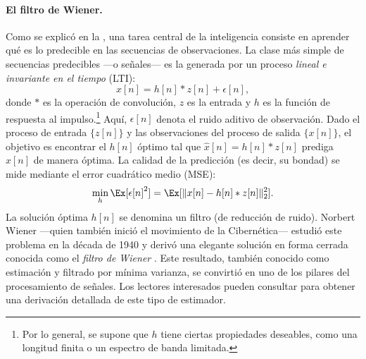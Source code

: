 \documentclass[../../book-main_es.tex]{subfiles}
\begin{document}
\paragraph{El filtro de Wiener.}
Como se explicó en la , una tarea central de
la inteligencia consiste en aprender qué es lo predecible en las secuencias de
observaciones. La clase más simple de secuencias predecibles ---o
señales--- es la generada por un proceso \textit{lineal e invariante en el tiempo} (LTI):
\begin{equation}
    x[n] = h[n]*z[n] + \epsilon[n],
    \label{eqn:Wiener-model}
\end{equation}
donde \(*\) es la operación de convolución, \(z\) es la entrada y
\(h\) es la función de respuesta al impulso.\footnote{Por lo general, se supone que \(h\)
tiene ciertas propiedades deseables, como una longitud finita
o un espectro de banda limitada.} Aquí, \(\epsilon[n]\) denota el
ruido aditivo de observación. Dado el proceso de entrada \(\{z[n]\}\) y
las observaciones del proceso de salida \(\{x[n]\}\), el objetivo es encontrar
el \(h[n]\) óptimo tal que \(\hat{x}[n] = h[n]*z[n]\) prediga
\(x[n]\) de manera óptima. La calidad de la predicción (es decir, su bondad) se mide
mediante el error cuadrático medio (MSE):
\begin{equation}
    \min_{h} \Ex[\epsilon[n]^{2}] = \Ex[\|x[n] - h[n]*z[n]\|_{2}^{2}].
    \label{eqn:wiener-mse}
\end{equation}
La solución óptima \(h[n]\) se denomina un filtro (de reducción de ruido). 
Norbert Wiener ---quien también inició el movimiento de la Cibernética--- estudió 
este problema en la década de 1940 y derivó una elegante solución en forma cerrada
conocida como el \textit{filtro de Wiener} \cite{Wiener-1942,Wiener-1949}.
Este resultado, también conocido como estimación y filtrado por mínima varianza,
se convirtió en uno de los pilares del procesamiento de señales. Los lectores interesados
pueden consultar \cite[Apéndice B]{MaY2003} para obtener una derivación detallada
de este tipo de estimador.
\end{document}

